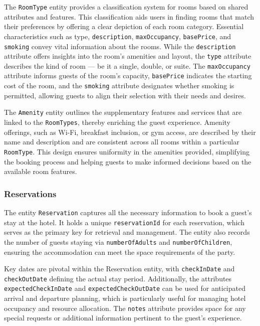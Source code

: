 The \texttt{RoomType} entity provides a classification system for rooms based on shared attributes and features. This classification aids users in finding rooms that match their preferences by offering a clear depiction of each room category. Essential characteristics such as type, \texttt{description}, \texttt{maxOccupancy}, \texttt{basePrice}, and \texttt{smoking} convey vital information about the rooms. While the \texttt{description} attribute offers insights into the room's amenities and layout, the \texttt{type} attribute describes the kind of room --- be it a single, double, or suite. The \texttt{maxOccupancy} attribute informs guests of the room's capacity, \texttt{basePrice} indicates the starting cost of the room, and the \texttt{smoking} attribute designates whether smoking is permitted, allowing guests to align their selection with their needs and desires.

The \texttt{Amenity} entity outlines the supplementary features and services that are linked to the \texttt{RoomTypes}, thereby enriching the guest experience. Amenity offerings, such as Wi-Fi, breakfast inclusion, or gym access, are described by their name and description and are consistent across all rooms within a particular \texttt{RoomType}. This design ensures uniformity in the amenities provided, simplifying the booking process and helping guests to make informed decisions based on the available room features.

\pagebreak

\subsubsection{Reservations}

The entity \texttt{Reservation} captures all the necessary information to book a guest's stay at the hotel. It holds a unique \texttt{reservationId} for each reservation, which serves as the primary key for retrieval and management. The entity also records the number of guests staying via \texttt{numberOfAdults} and \texttt{numberOfChildren}, ensuring the accommodation can meet the space requirements of the party.

Key dates are pivotal within the Reservation entity, with \texttt{checkInDate} and \texttt{checkOutDate} defining the actual stay period. Additionally, the attributes \texttt{expectedCheckInDate} and \texttt{expectedCheckOutDate} can be used for anticipated arrival and departure planning, which is particularly useful for managing hotel occupancy and resource allocation. The \texttt{notes} attribute provides space for any special requests or additional information pertinent to the guest's experience.

